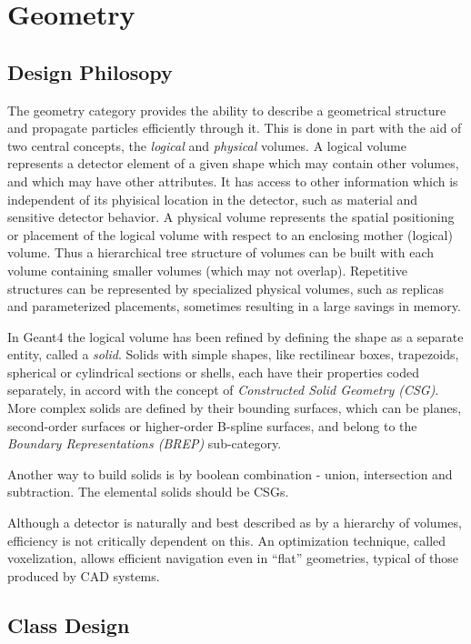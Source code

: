 \chapter{Geometry}

\section{Design Philosopy}
The geometry category provides the ability to describe a geometrical structure 
and propagate particles efficiently through it.  This is done in part with 
the aid of two central concepts, the {\it logical} and {\it physical} volumes.
A logical volume represents a detector element of a given shape which may
contain other volumes, and which may have other attributes.  It has access to
other information which is independent of its phyisical location in the 
detector, such as material and sensitive detector behavior.  A physical volume
represents the spatial positioning or placement of the logical volume with
respect to an enclosing mother (logical) volume.  Thus a hierarchical tree
structure of volumes can be built with each volume containing smaller volumes
(which may not overlap).  Repetitive structures can be represented by 
specialized physical volumes, such as replicas and parameterized placements,
sometimes resulting in a large savings in memory. 

In {\sc Geant4} the logical volume has been refined by defining the shape as 
a separate entity, called a {\it solid}.  Solids with simple shapes, like 
rectilinear boxes, trapezoids, spherical or cylindrical sections or shells,
each have their properties coded separately, in accord with the concept of
{\it Constructed Solid Geometry (CSG)}.  More complex solids are defined by 
their bounding surfaces, which can be planes, second-order surfaces or 
higher-order B-spline surfaces, and belong to the {\it Boundary 
Representations (BREP)} sub-category.

Another way to build solids is by boolean combination - union, intersection 
and subtraction.  The elemental solids should be CSGs.  

Although a detector is naturally and best described as by a hierarchy of
volumes, efficiency is not critically dependent on this.  An optimization
technique, called voxelization, allows efficient navigation even in ``flat''
geometries, typical of those produced by CAD systems.
  
\section{Class Design} 

